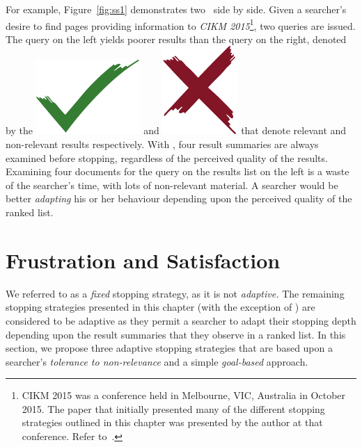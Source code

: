 For example, Figure~\ref{fig:ss1} demonstrates two~ side by side. Given a searcher's desire to find pages providing information to \emph{CIKM 2015}\footnote{CIKM 2015 was a conference held in Melbourne, VIC, Australia in October 2015. The paper that initially presented many of the different stopping strategies outlined in this chapter was presented by the author at that conference. Refer to~\cite{maxwell2015stopping_strategies}.}, two queries are issued. The query on the left yields poorer results than the query on the right, denoted by the \includegraphics[height=\fontcharht\font`\d]{figures/ch0-tick.pdf} and \includegraphics[height=\fontcharht\font`\d]{figures/ch0-cross.pdf} that denote relevant and non-relevant results respectively. With , four result summaries are always examined before stopping, regardless of the perceived quality of the results. Examining four documents for the query on the results list on the left is a waste of the searcher's time, with lots of non-relevant material. A searcher would be better \emph{adapting} his or her behaviour depending upon the perceived quality of the ranked list.

\section{Frustration and Satisfaction}\label{sec:strategies:frus_disg}
We referred to  as a \emph{fixed} stopping strategy, as it is not \emph{adaptive.} The remaining stopping strategies presented in this chapter (with the exception of ) are considered to be adaptive as they permit a searcher to adapt their stopping depth depending upon the result summaries that they observe in a ranked list. In this section, we propose three adaptive stopping strategies that are based upon a searcher's \emph{tolerance to non-relevance} and a simple \emph{goal-based} approach.

